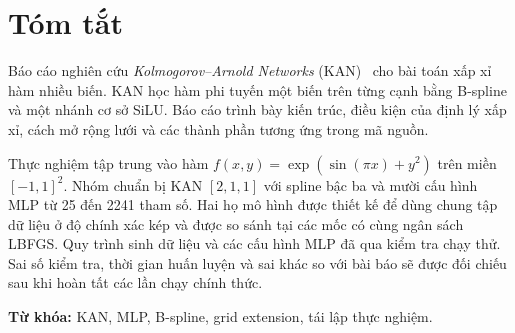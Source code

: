 \chapter*{Tóm tắt}
Báo cáo nghiên cứu \emph{Kolmogorov--Arnold Networks} (KAN)~\cite{liu2025kan} cho bài toán xấp xỉ hàm nhiều biến. KAN học hàm phi tuyến một biến trên từng cạnh bằng B-spline và một nhánh cơ sở SiLU. Báo cáo trình bày kiến trúc, điều kiện của định lý xấp xỉ, cách mở rộng lưới và các thành phần tương ứng trong mã nguồn.

Thực nghiệm tập trung vào hàm $f(x,y)=\exp(\sin(\pi x)+y^2)$ trên miền $[-1,1]^2$. Nhóm chuẩn bị KAN $[2,1,1]$ với spline bậc ba và mười cấu hình MLP từ 25 đến 2241 tham số. Hai họ mô hình được thiết kế để dùng chung tập dữ liệu ở độ chính xác kép và được so sánh tại các mốc có cùng ngân sách LBFGS. Quy trình sinh dữ liệu và các cấu hình MLP đã qua kiểm tra chạy thử. Sai số kiểm tra, thời gian huấn luyện và sai khác so với bài báo sẽ được đối chiếu sau khi hoàn tất các lần chạy chính thức.

\noindent\textbf{Từ khóa:} KAN, MLP, B-spline, grid extension, tái lập thực nghiệm.
